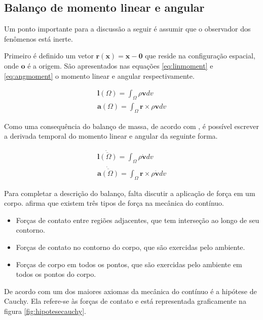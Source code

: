 \subsection{Balanço de momento linear e angular}

Um ponto importante para a discussão a seguir é assumir que o observador dos fenômenos está inerte. \par

Primeiro é definido um vetor $ \boldsymbol{r(x) = x - 0} $ que reside na configuração espacial, onde $ \boldsymbol{o} $ é a origem. São apresentados nas equações \ref{eq:linmoment} e \ref{eq:angmoment} o momento linear e angular respectivamente.

\begin{align}
    \boldsymbol{l}(\Omega) = \int_{\Omega} \rho \boldsymbol{v} dv \label{eq:linmoment} \\
    \boldsymbol{a}(\Omega) = \int_{\Omega} \boldsymbol{r} \times \rho \boldsymbol{v} dv \label{eq:angmoment}
\end{align}

Como uma consequência do balanço de massa, de acordo com \cite{gurtin_fried_anand_2013}, é possível escrever a derivada temporal do momento linear e angular da seguinte forma.

\begin{align}
   \dot{\overline{\boldsymbol{l}(\Omega)}} = \int_{\Omega} \rho \dot{\boldsymbol{v}} dv \label{eq:linmoment} \\
   \dot{\overline{\boldsymbol{a}(\Omega)}} = \int_{\Omega} \boldsymbol{r} \times \rho \dot{\boldsymbol{v}} dv \label{eq:angmoment}
\end{align}

Para completar a descrição do balanço, falta discutir a aplicação de força em um corpo. \cite{gurtin_fried_anand_2013} afirma que existem três tipos de força na mecânica do contínuo. 
\begin{itemize}
    \item Forças de contato entre regiões adjacentes, que tem interseção ao longo de seu contorno.
    \item Forças de contato no contorno do corpo, que são exercidas pelo ambiente.
    \item Forças de corpo em todos os pontos, que são exercidas pelo ambiente em todos os pontos do corpo.
\end{itemize}
De acordo com \cite{gurtin_fried_anand_2013} um dos maiores axiomas da mecânica do contínuo é a hipótese de Cauchy. Ela refere-se às forças de contato e está representada graficamente na figura \ref{fig:hipotesecauchy}. 

